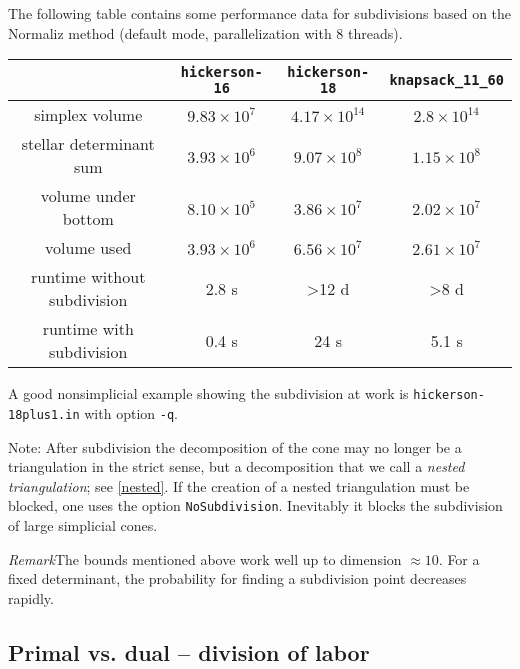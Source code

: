 \documentclass[12pt,a4paper]{scrartcl}
\theoremstyle{definition}
\def\ttt{\texttt}
\begin{document}
{The following table contains some performance data for subdivisions based on the Normaliz method (default mode, parallelization with 8 threads).
\begin{center}
\setlength{\tabcolsep}{3.2pt}
\renewcommand{\arraystretch}{1.2}
\begin{tabular}{|c|c|c|c|}
\hline
& \ttt{hickerson-16} & \ttt{hickerson-18} & \ttt{knapsack\_11\_60}  \\ \hline
simplex volume & $9.83\times 10^7$ & $4.17\times 10^{14}$ & $2.8\times 10^{14}$ \\ \hline
stellar determinant sum & $3.93\times 10^6$  & $9.07\times 10^8$  & $1.15\times 10^8$\\ \hline
volume under bottom  & $8.10\times 10^5$ & $3.86\times 10^7$ & $2.02\times 10^7$ \\ \hline 
volume used     & $3.93\times 10^6$ & $6.56\times 10^7$ & $2.61\times 10^7$ \\ \hline
runtime without subdivision   &  2.8 s & >12 d &  >8 d \\ \hline
runtime with subdivision    &  0.4 s & 24 s & 5.1 s \\ \hline
\end{tabular}
\end{center}

A good nonsimplicial example showing the subdivision at work is \verb|hickerson-18plus1.in| with option \verb|-q|.

Note: After subdivision the decomposition of the cone may no longer be a triangulation in the strict sense, but a decomposition that we call a \emph{nested triangulation}; see \ref{nested}. If the creation of a nested triangulation must be blocked, one uses the option \verb|NoSubdivision|. Inevitably it blocks the subdivision of large simplicial cones.

\emph{Remark}\enspace The bounds mentioned above work well up to dimension $\approx 10$. For a fixed determinant, the probability for finding a subdivision point decreases rapidly.

\subsection{Primal vs. dual -- division of labor}\label{div_labor}


}
\end{document}
